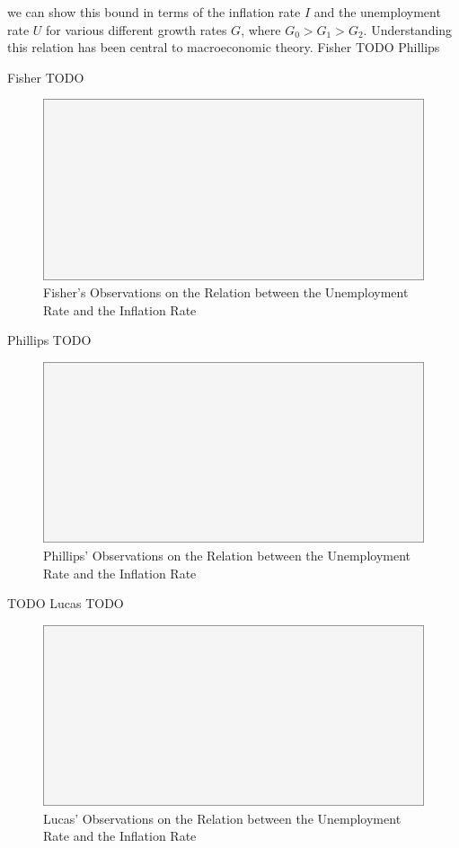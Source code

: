 we can show this bound in terms of the inflation
rate $I$ and the unemployment rate $U$ for various different growth rates $G$, where $G_0 > G_1 >
G_2$. Understanding this relation has been central to macroeconomic theory.  Fisher TODO Phillips

Fisher TODO

\begin{figure}[H]
\centering
\includegraphics[scale=0.48]{blank}
\caption{Fisher's Observations on the Relation between the Unemployment Rate and the Inflation Rate}
\label{fig:ui_fisher}
\end{figure}

Phillips TODO

\begin{figure}[H]
\centering
\includegraphics[scale=0.48]{blank}
\caption{Phillips' Observations on the Relation between the Unemployment Rate and the Inflation Rate}
\label{fig:ui_phillips}
\end{figure}

TODO Lucas TODO

\begin{figure}[H]
\centering
\includegraphics[scale=0.48]{blank}
\caption{Lucas' Observations on the Relation between the Unemployment Rate and the Inflation Rate}
\label{fig:ui_lucas}
\end{figure}

